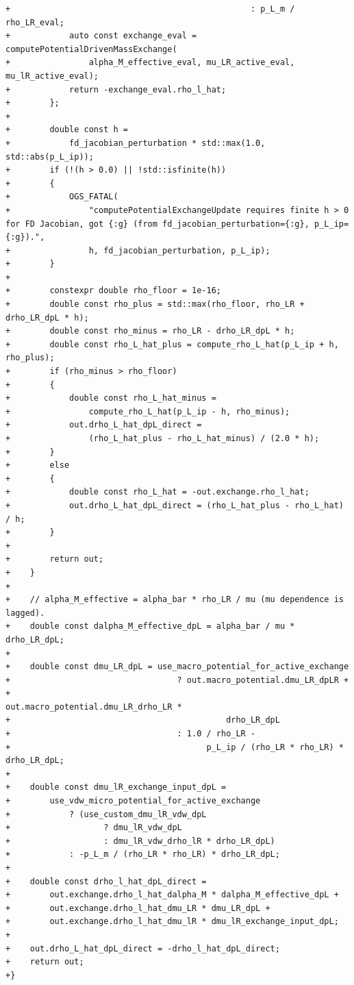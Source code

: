 \documentclass[10pt]{article}
\begin{document}
\begin{lstlisting}
+                                                 : p_L_m / rho_LR_eval;
+            auto const exchange_eval = computePotentialDrivenMassExchange(
+                alpha_M_effective_eval, mu_LR_active_eval, mu_lR_active_eval);
+            return -exchange_eval.rho_l_hat;
+        };
+
+        double const h =
+            fd_jacobian_perturbation * std::max(1.0, std::abs(p_L_ip));
+        if (!(h > 0.0) || !std::isfinite(h))
+        {
+            OGS_FATAL(
+                "computePotentialExchangeUpdate requires finite h > 0 for FD Jacobian, got {:g} (from fd_jacobian_perturbation={:g}, p_L_ip={:g}).",
+                h, fd_jacobian_perturbation, p_L_ip);
+        }
+
+        constexpr double rho_floor = 1e-16;
+        double const rho_plus = std::max(rho_floor, rho_LR + drho_LR_dpL * h);
+        double const rho_minus = rho_LR - drho_LR_dpL * h;
+        double const rho_L_hat_plus = compute_rho_L_hat(p_L_ip + h, rho_plus);
+        if (rho_minus > rho_floor)
+        {
+            double const rho_L_hat_minus =
+                compute_rho_L_hat(p_L_ip - h, rho_minus);
+            out.drho_L_hat_dpL_direct =
+                (rho_L_hat_plus - rho_L_hat_minus) / (2.0 * h);
+        }
+        else
+        {
+            double const rho_L_hat = -out.exchange.rho_l_hat;
+            out.drho_L_hat_dpL_direct = (rho_L_hat_plus - rho_L_hat) / h;
+        }
+
+        return out;
+    }
+
+    // alpha_M_effective = alpha_bar * rho_LR / mu (mu dependence is lagged).
+    double const dalpha_M_effective_dpL = alpha_bar / mu * drho_LR_dpL;
+
+    double const dmu_LR_dpL = use_macro_potential_for_active_exchange
+                                  ? out.macro_potential.dmu_LR_dpLR +
+                                        out.macro_potential.dmu_LR_drho_LR *
+                                            drho_LR_dpL
+                                  : 1.0 / rho_LR -
+                                        p_L_ip / (rho_LR * rho_LR) * drho_LR_dpL;
+
+    double const dmu_lR_exchange_input_dpL =
+        use_vdw_micro_potential_for_active_exchange
+            ? (use_custom_dmu_lR_vdw_dpL
+                   ? dmu_lR_vdw_dpL
+                   : dmu_lR_vdw_drho_lR * drho_LR_dpL)
+            : -p_L_m / (rho_LR * rho_LR) * drho_LR_dpL;
+
+    double const drho_l_hat_dpL_direct =
+        out.exchange.drho_l_hat_dalpha_M * dalpha_M_effective_dpL +
+        out.exchange.drho_l_hat_dmu_LR * dmu_LR_dpL +
+        out.exchange.drho_l_hat_dmu_lR * dmu_lR_exchange_input_dpL;
+
+    out.drho_L_hat_dpL_direct = -drho_l_hat_dpL_direct;
+    return out;
+}

\end{lstlisting}
\end{document}
